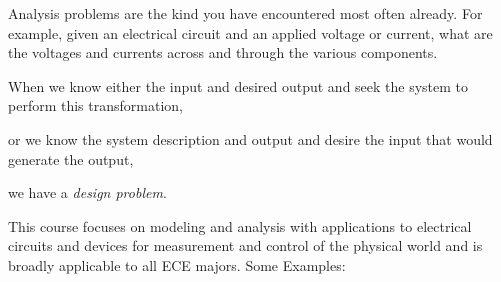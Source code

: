 \begin{center}
\end{center}

Analysis problems are the kind you have encountered most often already. For example, given an electrical circuit and an applied voltage or current, what are the voltages and currents across and through the various components.

When we know either the input and desired output and seek the system to perform this transformation,
\begin{center}
\end{center}

or we know the system description and output and desire the input that would generate the output,

\begin{center}
\end{center}

we have a {\it design problem}.

This course focuses on modeling and analysis with applications to electrical circuits and devices for measurement and control of the physical world and is broadly applicable to all ECE majors. Some Examples:

